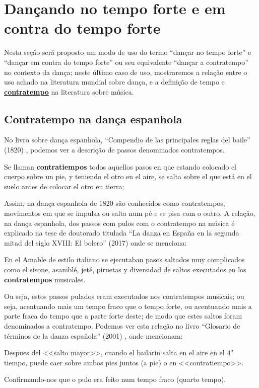 \newpage
\section{Dançando no tempo forte e em contra do tempo forte}
\label{sec:dancandotempoforte}

Nesta seção será proposto um modo de uso do termo
``dançar no tempo forte'' e
``dançar em contra do tempo forte'' ou seu equivalente 
``dançar a contratempo'' no contexto da dança;
neste último caso de uso, mostraremos a relação entre o uso achado na literatura mundial sobre dança,
e a definição de tempo e \hyperref[sec:contratempo]{\textbf{contratempo}} na literatura sobre música.

\subsection{Contratempo na dança espanhola}
\label{subsec:contratempoespanha}
No livro sobre dança espanhola, ``Compendio de las principales reglas del baile'' (1820) \cite[pp. 131]{cairon1820compendio},
podemos ver a descrição de passos denominados contratempos.
\begin{citando}
Se llaman \textbf{contratiempos} todos aquellos pasos en que estando colocado el cuerpo sobre un pie,
y teniendo el otro en el aire,
se salta sobre el que está en el suelo antes de colocar el otro en tierra;
\end{citando}
Assim, na dança espanhola de 1820 são conhecidos como contratempos,
movimentos em que se impulsa ou salta num pé e se pisa com o outro. 
A relação, na dança espanhola,  dos passos com pulos
com o contratempo na música 
é explicado na tese de doutorado titulada 
``La danza en España en la segunda mitad del siglo XVIII: El bolero'' (2017)
\cite[pp. 160]{martin2017danza} onde se menciona:
\begin{citando}
En el Amable de estilo italiano se ejecutaban pasos saltados muy complicados como el sisone,
asamblé, jeté, piruetas y diversidad de saltos executados en los \textbf{contratempos} musicales.
\end{citando}
Ou seja, estos passos pulados eram executados nos contratempos musicais;
ou seja, acentuando mais um tempo fraco que o tempo forte,
ou acentuando mais a parte fraca do tempo que a parte forte deste;
de modo que estes saltos foram denominados a contratempo.
Podemos ver esta relação no livro ``Glosario de términos de la danza española'' (2001)
\cite[pp. 109]{aubero2001glosario}, onde mencionam:
\begin{citando}
Despues del <<salto mayor>>, cuando el bailarín salta en el aire en el $4^o$ tiempo,
puede caer sobre ambos pies juntos (a pie) o en <<contratiempo>>.
\end{citando}
Confirmando-nos que o pulo era feito num tempo fraco (quarto tempo).



